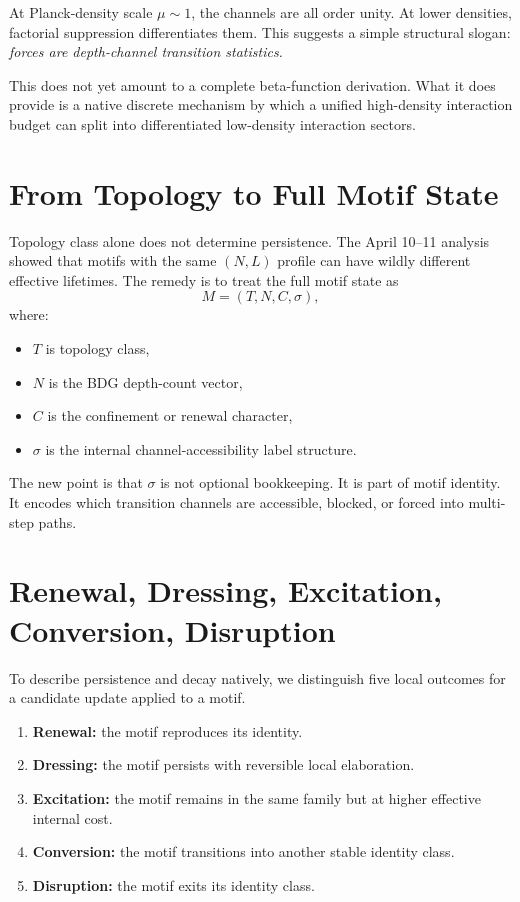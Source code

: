 \documentclass[11pt]{article}
\begin{document}
At Planck-density scale $\mu\sim 1$, the channels are all order unity. At lower densities, factorial suppression differentiates them. This suggests a simple structural slogan: \emph{forces are depth-channel transition statistics.}

This does not yet amount to a complete beta-function derivation. What it does provide is a native discrete mechanism by which a unified high-density interaction budget can split into differentiated low-density interaction sectors.

\section{From Topology to Full Motif State}
Topology class alone does not determine persistence. The April 10--11 analysis showed that motifs with the same $(N,L)$ profile can have wildly different effective lifetimes. The remedy is to treat the full motif state as
\begin{equation}
M=(T,N,C,\sigma),
\end{equation}
where:
\begin{itemize}
    \item $T$ is topology class,
    \item $N$ is the BDG depth-count vector,
    \item $C$ is the confinement or renewal character,
    \item $\sigma$ is the internal channel-accessibility label structure.
\end{itemize}

The new point is that $\sigma$ is not optional bookkeeping. It is part of motif identity. It encodes which transition channels are accessible, blocked, or forced into multi-step paths.

\section{Renewal, Dressing, Excitation, Conversion, Disruption}
To describe persistence and decay natively, we distinguish five local outcomes for a candidate update applied to a motif.
\begin{enumerate}[label=\arabic*.]
    \item \textbf{Renewal:} the motif reproduces its identity.
    \item \textbf{Dressing:} the motif persists with reversible local elaboration.
    \item \textbf{Excitation:} the motif remains in the same family but at higher effective internal cost.
    \item \textbf{Conversion:} the motif transitions into another stable identity class.
    \item \textbf{Disruption:} the motif exits its identity class.
\end{enumerate}
\end{document}
